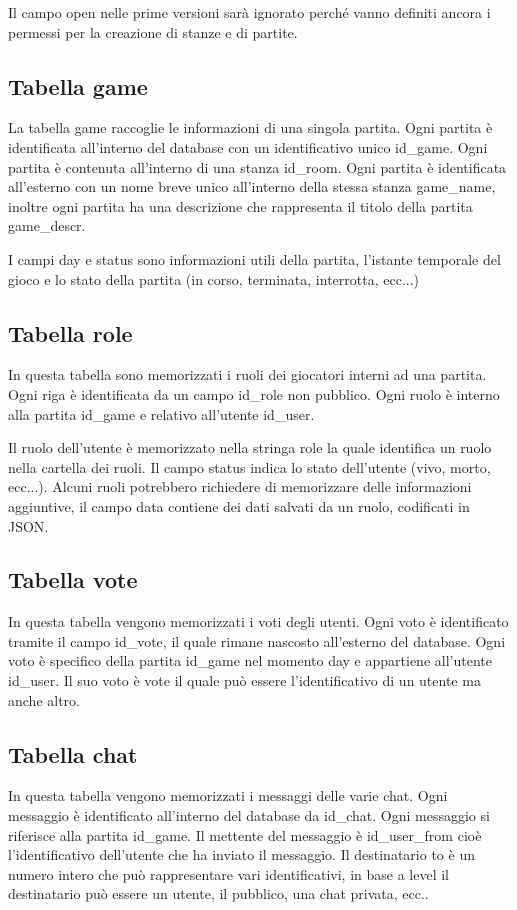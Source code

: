 \documentclass[10pt,a4paper]{article}
\begin{document}
Il campo \textsf{open} nelle prime versioni sarà ignorato perché vanno definiti ancora i permessi per la creazione di stanze e di partite.

\subsection{Tabella game}
La tabella game raccoglie le informazioni di una singola partita. Ogni partita è identificata all'interno del database con un identificativo unico \textsf{id\_game}. Ogni partita è contenuta all'interno di una stanza \textsf{id\_room}. Ogni partita è identificata all'esterno con un nome breve unico all'interno della stessa stanza \textsf{game\_name}, inoltre ogni partita ha una descrizione che rappresenta il titolo della partita \textsf{game\_descr}.

I campi \textsf{day} e \textsf{status} sono informazioni utili della partita, l'istante temporale del gioco e lo stato della partita (in corso, terminata, interrotta, ecc...)

\subsection{Tabella role}
In questa tabella sono memorizzati i ruoli dei giocatori interni ad una partita. Ogni riga è identificata da un campo \textsf{id\_role} non pubblico. Ogni ruolo è interno alla partita \textsf{id\_game} e relativo all'utente \textsf{id\_user}. 

Il ruolo dell'utente è memorizzato nella stringa \textsf{role} la quale identifica un ruolo nella cartella dei ruoli. Il campo \textsf{status} indica lo stato dell'utente (vivo, morto, ecc...). Alcuni ruoli potrebbero richiedere di memorizzare delle informazioni aggiuntive, il campo \textsf{data} contiene dei dati salvati da un ruolo, codificati in \textsf{JSON}.

\subsection{Tabella vote}
In questa tabella vengono memorizzati i voti degli utenti. Ogni voto è identificato tramite il campo \textsf{id\_vote}, il quale rimane nascosto all'esterno del database. Ogni voto è specifico della partita \textsf{id\_game} nel momento \textsf{day} e appartiene all'utente \textsf{id\_user}. Il suo voto è \textsf{vote} il quale può essere l'identificativo di un utente ma anche altro. 

\subsection{Tabella chat}
In questa tabella vengono memorizzati i messaggi delle varie chat. Ogni messaggio è identificato all'interno del database da \textsf{id\_chat}. Ogni messaggio si riferisce alla partita \textsf{id\_game}. Il mettente del messaggio è \textsf{id\_user\_from} cioè l'identificativo dell'utente che ha inviato il messaggio. Il destinatario \textsf{to} è un numero intero che può rappresentare vari identificativi, in base a \textsf{level} il destinatario può essere un utente, il pubblico, una chat privata, ecc..
\end{document}
